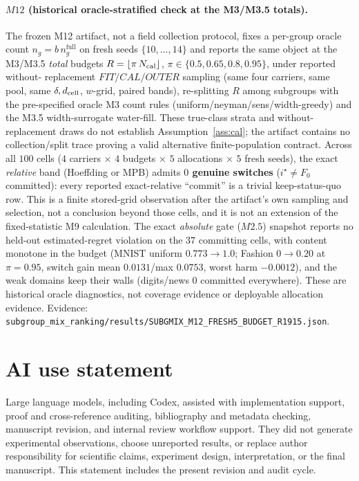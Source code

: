 \documentclass{article}
\begin{document}
\paragraph{$M12$ (historical oracle-stratified check at the M3/M3.5 totals).}
The frozen M12 artifact, not a field collection protocol, fixes a per-group oracle count
$n_g=b\,n_g^{\mathrm{full}}$ on fresh seeds $\{10,\dots,14\}$ and reports the same object at the M3/M3.5 \emph{total}
budgets $R=\lfloor\pi\,N_{\rm cal}\rfloor$, $\pi\in\{0.5,0.65,0.8,0.95\}$, under reported without-
replacement $FIT/CAL/OUTER$ sampling (same four carriers, same pool, same $\delta,d_{\rm cell}$,
$w$-grid, paired bands), re-splitting $R$ among subgroups with the pre-specified oracle M3 count rules
(uniform/neyman/sens/width-greedy) and the M3.5 width-surrogate water-fill. These true-class
strata and without-replacement draws do not establish Assumption~\ref{ass:cal}; the artifact
contains no collection/split trace proving a valid alternative finite-population contract. Across all $100$ cells
($4$ carriers $\times$ $4$ budgets $\times$ $5$ allocations $\times$ $5$ fresh seeds), the exact
\emph{relative} band (Hoeffding or MPB) admits \textbf{$0$ genuine switches} ($i^\star\!\ne\!F_0$
committed): every reported exact-relative ``commit'' is a trivial keep-status-quo row. This is
a finite stored-grid observation after the artifact's own sampling and selection, not a
conclusion beyond those cells, and it is not an extension of the fixed-statistic M9 calculation.
The exact \emph{absolute} gate ($M2.5$) snapshot reports no held-out estimated-regret violation on the $37$ committing cells, with
content monotone in the budget (MNIST uniform $0.773\!\to\!1.0$; Fashion $0\!\to\!0.20$ at $\pi{=}0.95$,
switch gain mean $0.0131$/max $0.0753$, worst harm $-0.0012$), and the weak domains keep their walls
(digits/news $0$ committed everywhere). These are historical oracle diagnostics, not coverage
evidence or deployable allocation evidence. Evidence:
\texttt{subgroup\_mix\_ranking/results/SUBGMIX\_M12\_FRESH5\_BUDGET\_R1915.json}.

\section{AI use statement}
Large language models, including Codex, assisted with implementation support, proof and
cross-reference auditing, bibliography and metadata checking, manuscript revision, and
internal review workflow support. They did not generate experimental observations, choose
unreported results, or replace author responsibility for scientific claims, experiment design,
interpretation, or the final manuscript. This statement includes the present revision and
audit cycle.
\end{document}
